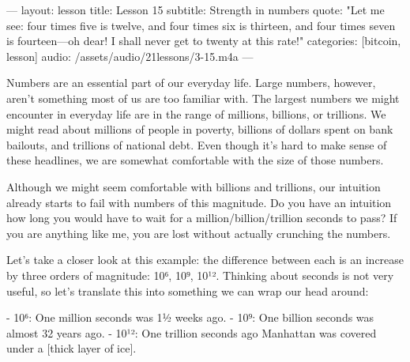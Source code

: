 ---
layout: lesson
title: Lesson 15
subtitle: Strength in numbers
quote: "Let me see: four times five is twelve, and four times six is thirteen, and four times seven is fourteen—oh dear! I shall never get to twenty at this rate!"
categories: [bitcoin, lesson]
audio: /assets/audio/21lessons/3-15.m4a 
---

Numbers are an essential part of our everyday life. Large numbers,
however, aren't something most of us are too familiar with. The largest
numbers we might encounter in everyday life are in the range of
millions, billions, or trillions. We might read about millions of people
in poverty, billions of dollars spent on bank bailouts, and trillions of
national debt. Even though it's hard to make sense of these headlines,
we are somewhat comfortable with the size of those numbers.

Although we might seem comfortable with billions and trillions, our
intuition already starts to fail with numbers of this magnitude. Do you
have an intuition how long you would have to wait for a
million/billion/trillion seconds to pass? If you are anything like me,
you are lost without actually crunching the numbers.

Let's take a closer look at this example: the difference between each is
an increase by three orders of magnitude: 10⁶, 10⁹, 10¹². Thinking about
seconds is not very useful, so let's translate this into something we
can wrap our head around:

-  10⁶: One million seconds was 1½ weeks ago.
-  10⁹: One billion seconds was almost 32 years ago.
-  10¹²: One trillion seconds ago Manhattan was covered under a [thick
    layer of ice].

